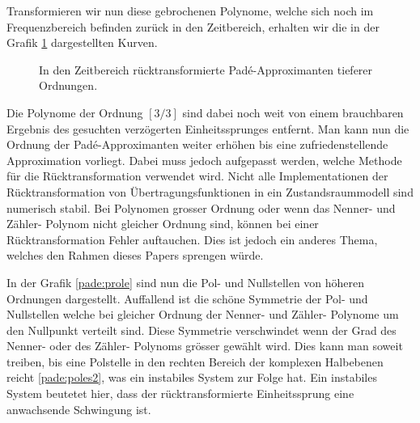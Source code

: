 Transformieren wir nun diese gebrochenen Polynome, welche sich noch
im Frequenzbereich befinden zurück in den Zeitbereich, erhalten wir
die in der Grafik \ref{pade:totzeitexp2} dargestellten Kurven.
\begin{figure}
\centering
{}
\caption{In den Zeitbereich rücktransformierte Padé-Approximanten tieferer Ordnungen\label{pade:totzeitexp2}.}
\end{figure}
Die Polynome der Ordnung $[3/3]$ sind dabei noch weit von einem brauchbaren Ergebnis des gesuchten verzögerten Einheitssprunges entfernt.
Man kann nun die Ordnung der Padé-Approximanten weiter erhöhen bis eine zufriedenstellende Approximation vorliegt.
Dabei muss jedoch aufgepasst werden, welche Methode für die
Rücktransformation verwendet wird.
Nicht alle Implementationen der Rücktransformation von Übertragungsfunktionen in ein Zustandsraummodell sind numerisch stabil. 
Bei Polynomen grosser Ordnung oder wenn das Nenner- und Zähler- Polynom nicht gleicher Ordnung sind, können bei einer Rücktransformation Fehler auftauchen.
Dies ist jedoch ein anderes Thema, welches den Rahmen dieses Papers sprengen würde.

In der Grafik \ref{pade:prole} sind nun die Pol- und Nullstellen von höheren Ordnungen dargestellt. 
Auffallend ist die schöne Symmetrie der Pol- und Nullstellen welche bei gleicher Ordnung der Nenner- und Zähler- Polynome um den Nullpunkt verteilt sind.
Diese Symmetrie verschwindet wenn der Grad des Nenner- oder des Zähler- Polynoms grösser gewählt wird.
Dies kann man soweit treiben, bis eine Polstelle in den rechten Bereich der komplexen Halbebenen reicht \ref{pade:poles2},
was ein instabiles System zur Folge hat.
Ein instabiles System beutetet hier, dass der rücktransformierte Einheitssprung eine anwachsende Schwingung ist.

